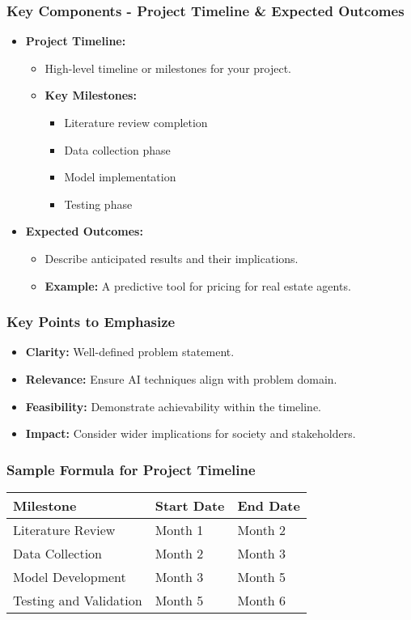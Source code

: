 \documentclass{beamer}
\begin{document}
\begin{frame}[fragile]
    \frametitle{Key Components - Project Timeline & Expected Outcomes}
    \begin{itemize}
        \item \textbf{Project Timeline:}
        \begin{itemize}
            \item High-level timeline or milestones for your project.
            \item \textbf{Key Milestones:}
            \begin{itemize}
                \item Literature review completion
                \item Data collection phase
                \item Model implementation
                \item Testing phase
            \end{itemize}
        \end{itemize}

        \item \textbf{Expected Outcomes:}
        \begin{itemize}
            \item Describe anticipated results and their implications.
            \item \textbf{Example:} A predictive tool for pricing for real estate agents.
        \end{itemize}
    \end{itemize}
\end{frame}

\begin{frame}[fragile]
    \frametitle{Key Points to Emphasize}
    \begin{itemize}
        \item \textbf{Clarity:} Well-defined problem statement.
        \item \textbf{Relevance:} Ensure AI techniques align with problem domain.
        \item \textbf{Feasibility:} Demonstrate achievability within the timeline.
        \item \textbf{Impact:} Consider wider implications for society and stakeholders.
    \end{itemize}
\end{frame}

\begin{frame}[fragile]
    \frametitle{Sample Formula for Project Timeline}
    \begin{tabular}{|l|l|l|}
        \hline
        \textbf{Milestone} & \textbf{Start Date} & \textbf{End Date} \\ \hline
        Literature Review & Month 1 & Month 2 \\ \hline
        Data Collection & Month 2 & Month 3 \\ \hline
        Model Development & Month 3 & Month 5 \\ \hline
        Testing and Validation & Month 5 & Month 6 \\ \hline
    \end{tabular}
\end{frame}
\end{document}

